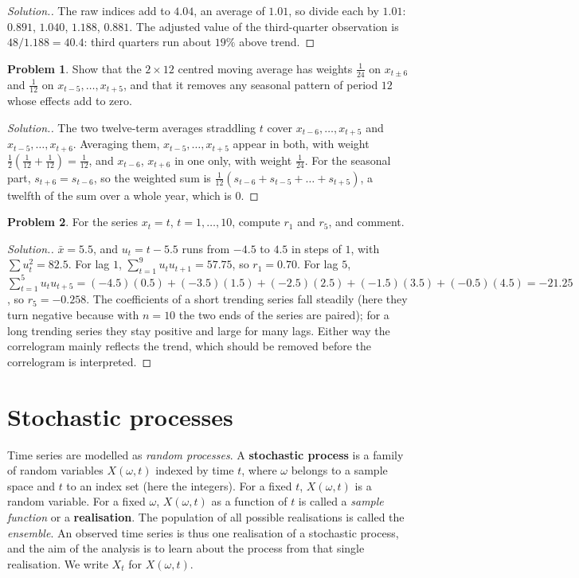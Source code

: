 \documentclass[11pt,a4paper]{article}
\theoremstyle{definition}
\newtheorem{problemx}{Problem}[subsection]
\newenvironment{problem}{\begin{problemx}}{\end{problemx}}
\newenvironment{solution}
  {\renewcommand{\qedsymbol}{}\begin{proof}[\textit{Solution}.]}
  {\end{proof}}
\begin{document}
\begin{solution}
The raw indices add to $4.04$, an average of $1.01$, so divide each by $1.01$: $0.891$, $1.040$, $1.188$, $0.881$. The adjusted value
of the third-quarter observation is $48/1.188 = 40.4$: third quarters run about $19\%$ above trend.
\end{solution}

\begin{problem}\label{prob:ts-12ma}
Show that the $2\times12$ centred moving average has weights $\frac{1}{24}$ on $x_{t\pm6}$ and $\frac{1}{12}$ on $x_{t-5}, \dots, x_{t+5}$, and that it removes any
seasonal pattern of period $12$ whose effects add to zero.
\end{problem}

\begin{solution}
The two twelve-term averages straddling $t$ cover $x_{t-6}, \dots, x_{t+5}$ and $x_{t-5}, \dots, x_{t+6}$. Averaging them, $x_{t-5}, \dots, x_{t+5}$ appear in
both, with weight $\frac12(\frac1{12} + \frac1{12}) = \frac1{12}$, and $x_{t-6}$, $x_{t+6}$ in one only, with weight $\frac1{24}$. For the seasonal part,
$s_{t+6} = s_{t-6}$, so the weighted sum is $\frac1{12}(s_{t-6} + s_{t-5} + \dots + s_{t+5})$, a twelfth of the sum over a whole year, which is $0$.
\end{solution}

\begin{problem}\label{prob:ts-trend-acf}
For the series $x_t = t$, $t = 1, \dots, 10$, compute $r_1$ and $r_5$, and comment.
\end{problem}

\begin{solution}
$\bar x = 5.5$, and $u_t = t - 5.5$ runs from $-4.5$ to $4.5$ in steps of $1$, with $\sum u_t^2 = 82.5$. For lag $1$, $\sum_{t=1}^9u_tu_{t+1} = 57.75$, so
$r_1 = 0.70$. For lag $5$, $\sum_{t=1}^5u_tu_{t+5} = (-4.5)(0.5) + (-3.5)(1.5) + (-2.5)(2.5) + (-1.5)(3.5) + (-0.5)(4.5) = -21.25$, so $r_5 = -0.258$. The
coefficients of a short trending series fall steadily (here they turn negative because with $n = 10$ the two ends of the
series are paired); for a long trending series they stay positive and large for many lags. Either way the
correlogram mainly reflects the trend, which should be removed before the correlogram is interpreted.
\end{solution}

\section{Stochastic processes}
Time series are modelled as \emph{random processes}. A \textbf{stochastic process} is a family of random
variables $X(\omega, t)$ indexed by time $t$, where $\omega$ belongs to a sample space and $t$ to an index set (here the integers).
For a fixed $t$, $X(\omega, t)$ is a random variable. For a fixed $\omega$, $X(\omega, t)$ as a function of $t$ is called a \emph{sample
function} or a \textbf{realisation}. The population of all possible realisations is called the \emph{ensemble}.
An observed time series is thus one realisation of a stochastic process, and the aim of the analysis is to
learn about the process from that single realisation. We write $X_t$ for $X(\omega, t)$.
\end{document}
